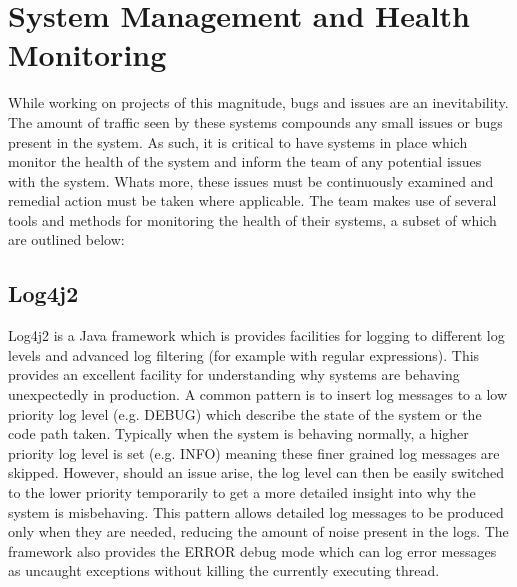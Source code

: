\section{System Management and Health Monitoring}
While working on projects of this magnitude, bugs and issues are an inevitability. The amount of traffic seen by these systems compounds any small issues or bugs present in the system. As such, it is critical to have systems in place which monitor the health of the system and inform the team of any potential issues with the system. Whats more, these issues must be continuously examined and remedial action must be taken where applicable. The \team{} team makes use of several tools and methods for monitoring the health of their systems, a subset of which are outlined below:

\subsection{Log4j2}\label{sec:log4j2}
Log4j2 \cite{log4j2} is a Java framework which is provides facilities for logging to different log levels and advanced log filtering (for example with regular expressions). This provides an excellent facility for understanding why systems are behaving unexpectedly in production. A common pattern is to insert log messages to a low priority log level (e.g. DEBUG) which describe the state of the system or the code path taken. Typically when the system is behaving normally, a higher priority log level is set (e.g. INFO) meaning these finer grained log messages are skipped. However, should an issue arise, the log level can then be easily switched to the lower priority temporarily to get a more detailed insight into why the system is misbehaving. This pattern allows detailed log messages to be produced only when they are needed, reducing the amount of noise present in the logs. The framework also provides the ERROR debug mode which can log error messages as uncaught exceptions without killing the currently executing thread.

